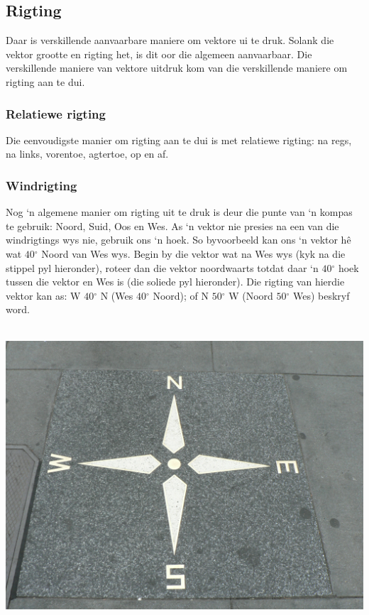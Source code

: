 \subsection*{Rigting}
            \nopagebreak
Daar is verskillende aanvaarbare maniere om vektore ui te druk. Solank die vektor grootte en rigting het, is dit oor die algemeen aanvaarbaar. Die verskillende maniere van vektore uitdruk kom van die verskillende maniere om rigting aan te dui.
      \label{m38812*uid5}
            \subsubsection*{Relatiewe rigting}
            \nopagebreak
Die eenvoudigste manier om rigting aan te dui is met relatiewe rigting: na regs, na links, vorentoe, agtertoe, op en af.
      \label{m38812*uid6}
            \subsubsection*{Windrigting}
            \nopagebreak
Nog ‘n algemene manier om rigting uit te druk is deur die punte van ‘n kompas te gebruik: Noord, Suid, Oos en Wes. As ‘n vektor nie presies na een van die windrigtings wys nie, gebruik ons ‘n hoek. So byvoorbeeld kan ons ‘n vektor h\^{e} wat $40{}^{\circ }$ Noord van Wes wys. Begin by die vektor wat na Wes wys (kyk na die stippel pyl hieronder), roteer dan die vektor noordwaarts totdat daar ‘n $40{}^{\circ }$ hoek tussen die vektor en Wes is (die soliede pyl hieronder). Die rigting van hierdie vektor kan as: W $40{}^{\circ }$ N (Wes $40{}^{\circ }$ Noord); of N $50{}^{\circ }$ W (Noord $50{}^{\circ }$ Wes) beskryf word.\\ \\
    \setcounter{subfigure}{0}
\begin{minipage}{.5\textwidth}
\begin{center}
\includegraphics[width=.4\textwidth]{photos/ecastro.jpg}
\end{center}
\end{minipage}
